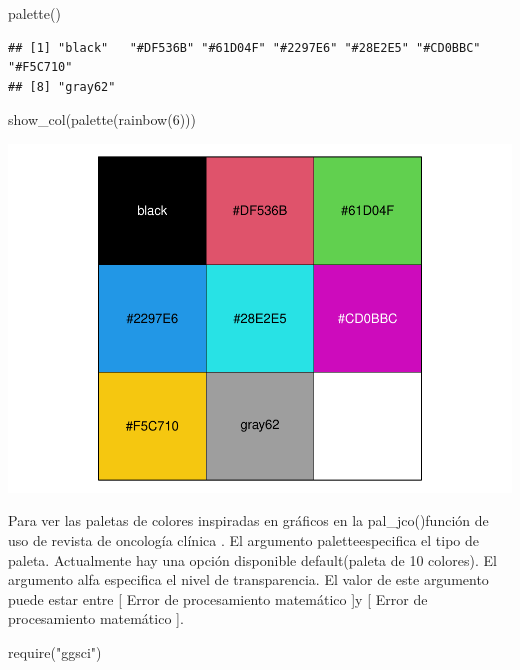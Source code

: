 \documentclass[
]{article}
\newenvironment{Shaded}{\begin{snugshade}}{\end{snugshade}}
\newcommand{\DecValTok}[1]{\textcolor[rgb]{0.00,0.00,0.81}{#1}}
\newcommand{\FunctionTok}[1]{\textcolor[rgb]{0.00,0.00,0.00}{#1}}
\newcommand{\NormalTok}[1]{#1}
\newcommand{\StringTok}[1]{\textcolor[rgb]{0.31,0.60,0.02}{#1}}
\begin{document}
\begin{Shaded}
\begin{Highlighting}[]
\FunctionTok{palette}\NormalTok{()}
\end{Highlighting}
\end{Shaded}

\begin{verbatim}
## [1] "black"   "#DF536B" "#61D04F" "#2297E6" "#28E2E5" "#CD0BBC" "#F5C710"
## [8] "gray62"
\end{verbatim}

\begin{Shaded}
\begin{Highlighting}[]
\FunctionTok{show\_col}\NormalTok{(}\FunctionTok{palette}\NormalTok{(}\FunctionTok{rainbow}\NormalTok{(}\DecValTok{6}\NormalTok{)))}
\end{Highlighting}
\end{Shaded}

\includegraphics{clusterjerarquico1_files/figure-latex/unnamed-chunk-8-1.pdf}

Para ver las paletas de colores inspiradas en gráficos en la
pal\_jco()función de uso de revista de oncología clínica . El argumento
paletteespecifica el tipo de paleta. Actualmente hay una opción
disponible default(paleta de 10 colores). El argumento alfa especifica
el nivel de transparencia. El valor de este argumento puede estar entre
{[} Error de procesamiento matemático {]}y {[} Error de procesamiento
matemático {]}.

\begin{Shaded}
\begin{Highlighting}[]
\FunctionTok{require}\NormalTok{(}\StringTok{"ggsci"}\NormalTok{)}
\end{Highlighting}
\end{Shaded}
\end{document}
